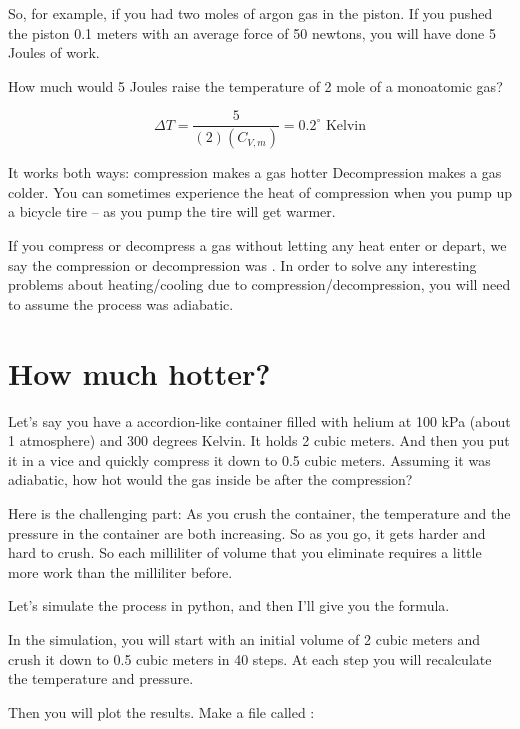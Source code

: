 So, for example,  if you had two moles of argon gas in the piston.  If you pushed the piston 0.1 meters with an average force of 50 newtons,  you will have done 5 Joules of work.

How much would 5 Joules raise the temperature of 2 mole of a monoatomic gas?  

$$\Delta T = \frac{5}{(2)(C_{V,m})} = 0.2^\circ \text{ Kelvin}$$ 

It works both ways:  compression makes a gas hotter  Decompression makes a gas colder.  You can sometimes experience the heat of compression when you pump up a bicycle tire -- as you pump the tire will get warmer.

If you compress or decompress a gas without letting any heat enter or depart,  we say the compression or decompression was .  In order to solve any interesting problems about heating/cooling due to compression/decompression,  you will need to assume the process was adiabatic.

\section{How much hotter?}

Let's say you have a accordion-like container filled with helium at 100 kPa (about 1 atmosphere) and 300 degrees Kelvin.  It holds 2 cubic meters.    And then you put it in a vice and quickly compress it down to 0.5 cubic meters.  Assuming it was adiabatic,  how hot would the gas inside be after the compression?

Here is the challenging part:  As you crush the container,  the temperature and the pressure in the container are both increasing.  So as you go,  it gets harder and hard to crush.  So each milliliter of volume that you eliminate requires a little more work than the milliliter before.

Let's simulate the process in python,  and then I'll give you the formula.  

In the simulation, you will start with an initial volume of 2 cubic meters and crush it down to 0.5 cubic meters in 40 steps.  At each step you will recalculate the temperature and pressure.

Then you will plot the results.  Make a file called :

